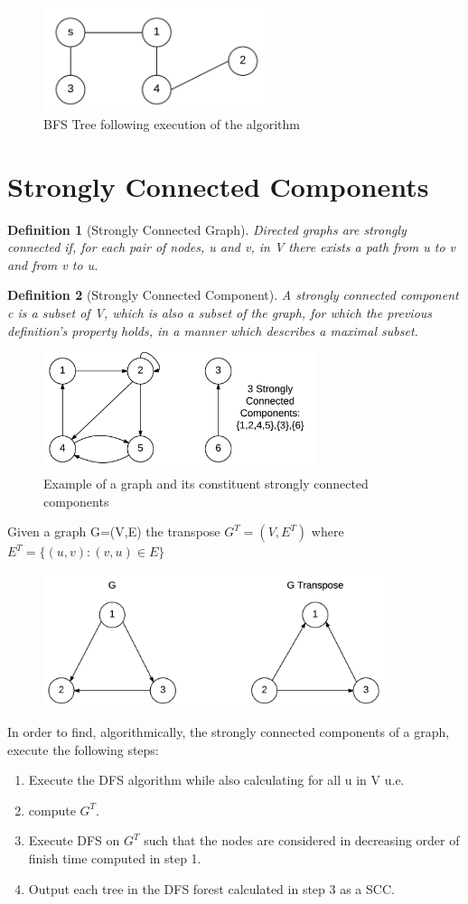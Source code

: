 \documentclass[12pt,letterpaper]{article}
\newtheorem{definition}{Definition}[section]
\begin{document}
\begin{figure}[h]
\centering
\includegraphics[width=6.5cm]{bfsTree}
\caption{BFS Tree following execution of the algorithm}
\end{figure}
\FloatBarrier
\section{Strongly Connected Components}
\begin{definition}[Strongly Connected Graph]\hfill \break
Directed graphs are strongly connected if, for each pair of nodes, u and v, in V there exists a path from u to v and from v to u. 
\end{definition}
\begin{definition}[Strongly Connected Component]\hfill \break
A strongly connected component c is a subset of V, which is also a subset of the graph, for which the previous definition's property holds, in a manner which describes a maximal subset. 
\end{definition}
\begin{figure}[h]
\centering
\includegraphics[width=8cm]{sccex}
\caption{Example of a graph and its constituent strongly connected components}
\end{figure}
Given a graph G=(V,E) the transpose $G^T=(V,E^T)$ where $E^T=\{(u,v):(v,u)\in E\}$
\begin{figure}[h]
\centering
\includegraphics[width=10cm]{graphtranspose}
\end{figure}
\FloatBarrier
In order to find, algorithmically, the strongly connected components of a graph, execute the following steps:
\begin{enumerate}
\item Execute the DFS algorithm while also calculating for all u in V u.e.
\item compute $G^T$.
\item Execute DFS on $G^T$ such that the nodes are considered in decreasing order of finish time computed in step 1.
\item Output each tree in the DFS forest calculated in step 3 as a SCC.
\end{enumerate}
\end{document}
